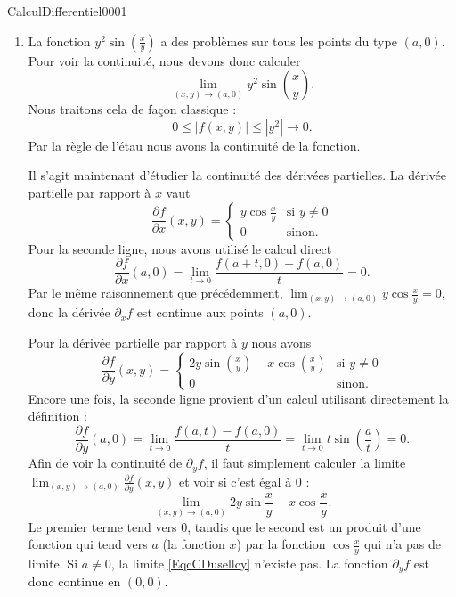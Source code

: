 \begin{corrige}{CalculDifferentiel0001}
\begin{enumerate}
		\item
			La fonction $y^2\sin\left( \frac{ x }{ y } \right)$ a des problèmes sur tous les points du type $(a,0)$. Pour voir la continuité, nous devons donc calculer
			\begin{equation}
				\lim_{(x,y)\to(a,0)}y^2\sin\left( \frac{ x }{ y } \right).
			\end{equation}
			Nous traitons cela de façon classique :
			\begin{equation}
				0\leq| f(x,y) |\leq | y^2 |\to 0.
			\end{equation}
			Par la règle de l'étau nous avons la continuité de la fonction.

			Il s'agit maintenant d'étudier la continuité des dérivées partielles. La dérivée partielle par rapport à $x$ vaut
			\begin{equation}
				\frac{ \partial f }{ \partial x }(x,y)=\begin{cases}
					y\cos\frac{ x }{ y }	&	\text{si $y\neq 0$}\\
					0	&	 \text{sinon.}
				\end{cases}
			\end{equation}
			Pour la seconde ligne, nous avons utilisé le calcul direct
			\begin{equation}
				\frac{ \partial f }{ \partial x }(a,0)=\lim_{t\to 0} \frac{ f(a+t,0)-f(a,0) }{ t }=0.
			\end{equation}
			Par le même raisonnement que précédemment, $\lim_{(x,y)\to(a,0)}y\cos\frac{ x }{ y }=0$, donc la dérivée $\partial_xf$ est continue aux points $(a,0)$.

			Pour la dérivée partielle par rapport à $y$ nous avons
			\begin{equation}
				\frac{ \partial f }{ \partial y }(x,y)=\begin{cases}
					2y\sin\left( \frac{ x }{ y } \right)-x\cos\left( \frac{ x }{ y } \right)	&	\text{si $y\neq 0$}\\
					0	&	 \text{sinon.}
				\end{cases}
			\end{equation}
			Encore une fois, la seconde ligne provient d'un calcul utilisant directement la définition :
			\begin{equation}
				\frac{ \partial f }{ \partial y }(a,0)=\lim_{t\to 0} \frac{ f(a,t)-f(a,0) }{ t }=\lim_{t\to 0} t\sin\left( \frac{ a }{ t } \right)=0.
			\end{equation}
			Afin de voir la continuité de $\partial_yf$, il faut simplement calculer la limite $\lim_{(x,y)\to(a,0)}\frac{ \partial f }{ \partial y }(x,y)$ et voir si c'est égal à $0$ :
			\begin{equation}		\label{EqcCDusellcy}
				\lim_{(x,y)\to(a,0)}2y\sin\frac{ x }{ y }-x\cos\frac{ x }{ y }.
			\end{equation}
			Le premier terme tend vers $0$, tandis que le second est un produit d'une fonction qui tend vers $a$ (la fonction $x$) par la fonction $\cos\frac{ x }{ y }$ qui n'a pas de limite. Si $a\neq 0$, la limite \eqref{EqcCDusellcy} n'existe pas. La fonction $\partial_yf$ est donc continue en $(0,0)$.


\end{enumerate}
\end{corrige}
